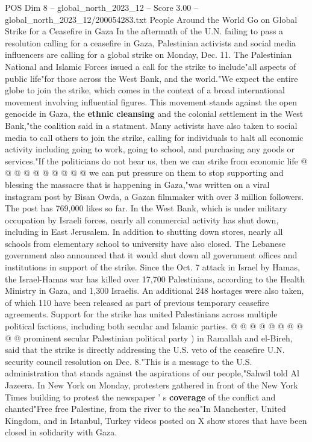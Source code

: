 \begin{textsample}{POS Dim 8 – global\_north\_2023\_12 – Score 3.00 – global\_north\_2023\_12/200054283.txt}  \label{ex:f8_pos_278}
People Around the World Go on Global Strike for a Ceasefire in Gaza In the aftermath of the U.N. failing to pass a resolution calling for a ceasefire in Gaza, Palestinian activists and social media influencers are calling for a global strike on Monday, Dec. 11.
The Palestinian National and Islamic Forces issued a call for the strike to include"all aspects of public life"for those across the West Bank, and the world."We expect the entire globe to join the strike, which comes in the context of a broad international movement involving influential figures.
This movement stands against the open genocide in Gaza, the \textbf{ethnic} \textbf{cleansing} and the colonial settlement in the West Bank,"the coalition said in a statment.
Many activists have also taken to social media to call others to join the strike, calling for individuals to halt all economic activity including going to work, going to school, and purchasing any goods or services."If the politicians do not hear us, then we can strike from economic life @ @ @ @ @ @ @ @ @ @ we can put pressure on them to stop supporting and blessing the massacre that is happening in Gaza,"was written on a viral instagram post by Bisan Owda, a Gazan filmmaker with over 3 million followers.
The post has 769,000 likes so far.
In the West Bank, which is under military occupation by Israeli forces, nearly all commercial activity has shut down, including in East Jerusalem.
In addition to shutting down stores, nearly all schools from elementary school to university have also closed.
The Lebanese government also announced that it would shut down all government offices and institutions in support of the strike.
Since the Oct. 7 attack in Israel by Hamas, the Israel-Hamas war has killed over 17,700 Palestinians, according to the Health Ministry in Gaza, and 1,300 Israelis.
An additional 248 hostages were also taken, of which 110 have been released as part of previous temporary ceasefire agreements.
Support for the strike has united Palestinians across multiple political factions, including both secular and Islamic parties. @ @ @ @ @ @ @ @ @ @ prominent secular Palestinian political party ) in Ramallah and el-Bireh, said that the strike is directly addressing the U.S. veto of the ceasefire U.N. security council resolution on Dec. 8."This is a message to the U.S. administration that stands against the aspirations of our people,"Sahwil told Al Jazeera.
In New York on Monday, protesters gathered in front of the New York Times building to protest the newspaper ' s \textbf{coverage} of the conflict and chanted"Free free Palestine, from the river to the sea"In Manchester, United Kingdom, and in Istanbul, Turkey videos posted on X show stores that have been closed in solidarity with Gaza.

\end{textsample}

